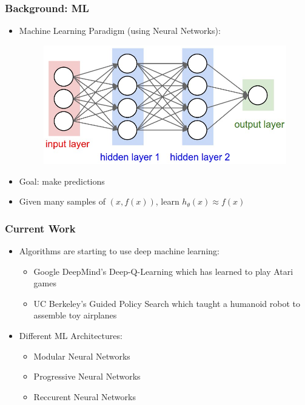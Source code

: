 \documentclass[12pt,handout]{beamer}
\begin{document}
\begin{frame}
    \frametitle{Background: ML}
    \begin{itemize}
        \item{Machine Learning Paradigm (using Neural Networks):
        \begin{figure}[p]
            \includegraphics[scale=0.2]{diagram2}
        \end{figure}}
        \item{Goal: make predictions}
        \item{Given many samples of $(x,f(x))$, learn $h_\theta(x)\approx{f(x)}$}
    \end{itemize}
\end{frame}
\begin{frame}
    \frametitle{Current Work}
    \begin{itemize}
        \item{Algorithms are starting to use deep machine learning:}
        \begin{itemize}
            \item{Google DeepMind's Deep-Q-Learning which has learned to play Atari games}
            \item{UC Berkeley's Guided Policy Search which taught a humanoid robot to assemble toy airplanes}
        \end{itemize}
        \item{Different ML Architectures:}
        \begin{itemize}
            \item{Modular Neural Networks}
            \item{Progressive Neural Networks}
            \item{Reccurent Neural Networks}
        \end{itemize}
    \end{itemize}
\end{frame}
\end{document}
